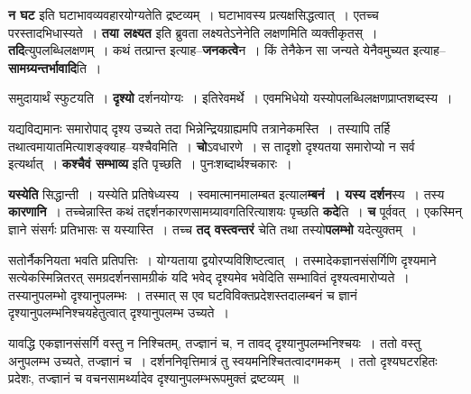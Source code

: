 \documentclass[article,12pt,a4paper]{memoir}
\begin{document}
	  \endgroup
	

	  \pstart \textbf{न घट} इति घटाभावव्यवहारयोग्यतेति द्रष्टव्यम् । घटाभावस्य प्रत्यक्षसिद्धत्वात् । एतच्च परस्तादभिधास्यते । \textbf{तया लक्ष्यत} इति ब्रुवता लक्ष्यतेऽनेनेति लक्षणमिति व्यक्तीकृतस् । \textbf{तदि}त्युपलब्धिलक्षणम् । कथं तत्प्रान्त इत्याह--\textbf{जनकत्वे}न । किं तेनैकेन सा जन्यते ये\leavevmode{}नैवमुच्यत इत्याह--\textbf{सामग्र्यन्तर्भावादि}ति ।
	\pend
      

	  \pstart समुदायार्थं स्फुटयति । \textbf{दृश्यो} दर्शनयोग्यः । इतिरेवमर्थे । एवमभिधेयो यस्योपलब्धिलक्षणप्राप्तशब्दस्य ।
	\pend
      

	  \pstart यद्यविद्यमानः समारोपाद् दृश्य उच्यते तदा भिन्नेन्द्रियग्राह्यमपि तत्रानेकमस्ति । तस्यापि तर्हि तथात्वमायातमित्याशङ्क्याह--यश्चैवमिति । \textbf{चो}ऽवधारणे । स तादृशो दृश्यतया समारोप्यो न सर्व इत्यर्थात् । \textbf{कश्चैवं सम्भाव्य} इति पृच्छति । पुनःशब्दार्थश्चकारः ।
	\pend
      

	  \pstart \textbf{यस्येति} सिद्धान्ती । यस्येति प्रतिषेध्यस्य । स्वमात्मानमालम्बत इत्याल\textbf{म्बनं । यस्य दर्शन}स्य । तस्य \textbf{कारणानि} । तच्चेन्नास्ति कथं तद्दर्शनकारणसामग्र्यावगतिरित्याशयः पृच्छति \textbf{कदे}ति । \textbf{च} पूर्ववत् । एकस्मिन् ज्ञाने संसर्गः प्रतिभासः स यस्यास्ति । तच्च \textbf{तद् वस्त्वन्तरं} चेति तथा तस्यो\textbf{पलम्भो} यदेत्युक्तम् ।
	\pend
	  \bigskip
	  \begingroup
	

	  \pstart सतोर्नैकनियता भवति प्रतिपत्तिः । योग्यताया द्वयोरप्यविशिष्टत्वात् । तस्मादेकज्ञानसंसर्गिणि दृश्यमाने सत्येकस्मिन्नितरत् समग्रदर्शनसामग्रीकं यदि भवेद् दृश्यमेव भवेदिति सम्भावितं दृश्यत्वमारोप्यते । तस्यानुपलम्भो दृश्यानुपलम्भः । तस्मात् स एव घटविविक्तप्रदेशस्तदालम्बनं च ज्ञानं दृश्यानुपलम्भनिश्चयहेतुत्वात् दृश्यानुपलम्भ उच्यते ।
	\pend
        

	  \pstart यावद्धि एकज्ञानसंसर्गि वस्तु न निश्चितम्, तज्ज्ञानं च, न तावद् दृश्यानुपलम्भनिश्चयः । ततो वस्तु अनुपलम्भ उच्यते, तज्ज्ञानं च । दर्शननिवृत्तिमात्रं तु स्वयमनिश्चितत्वादगमकम् । ततो दृश्यघटरहितः प्रदेशः, तज्ज्ञानं च वचनसामर्थ्यादेव दृश्यानुपलम्भरूपमुक्तं द्रष्टव्यम् ॥
	\pend
      
\end{document}
